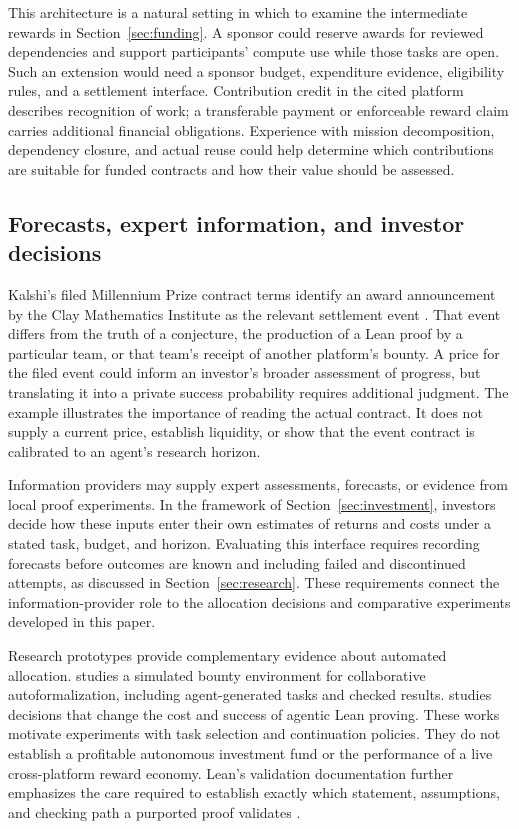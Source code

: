 \documentclass[11pt,a4paper]{article}
\begin{document}
This architecture is a natural setting in which to examine the intermediate rewards in Section~\ref{sec:funding}. A sponsor could reserve awards for reviewed dependencies and support participants' compute use while those tasks are open. Such an extension would need a sponsor budget, expenditure evidence, eligibility rules, and a settlement interface. Contribution credit in the cited platform describes recognition of work; a transferable payment or enforceable reward claim carries additional financial obligations. Experience with mission decomposition, dependency closure, and actual reuse could help determine which contributions are suitable for funded contracts and how their value should be assessed.

\subsection{Forecasts, expert information, and investor decisions}
Kalshi's filed Millennium Prize contract terms identify an award announcement by the Clay Mathematics Institute as the relevant settlement event \citep{kalshi}. That event differs from the truth of a conjecture, the production of a Lean proof by a particular team, or that team's receipt of another platform's bounty. A price for the filed event could inform an investor's broader assessment of progress, but translating it into a private success probability requires additional judgment. The example illustrates the importance of reading the actual contract. It does not supply a current price, establish liquidity, or show that the event contract is calibrated to an agent's research horizon.

Information providers may supply expert assessments, forecasts, or evidence from local proof experiments. In the framework of Section~\ref{sec:investment}, investors decide how these inputs enter their own estimates of returns and costs under a stated task, budget, and horizon. Evaluating this interface requires recording forecasts before outcomes are known and including failed and discontinued attempts, as discussed in Section~\ref{sec:research}. These requirements connect the information-provider role to the allocation decisions and comparative experiments developed in this paper.

Research prototypes provide complementary evidence about automated allocation. \citet{hunt} studies a simulated bounty environment for collaborative autoformalization, including agent-generated tasks and checked results. \citet{costquality} studies decisions that change the cost and success of agentic Lean proving. These works motivate experiments with task selection and continuation policies. They do not establish a profitable autonomous investment fund or the performance of a live cross-platform reward economy. Lean's validation documentation further emphasizes the care required to establish exactly which statement, assumptions, and checking path a purported proof validates \citep{lean}.
\end{document}
